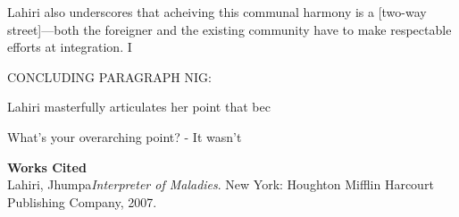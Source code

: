 \documentclass[12pt]{article}
\begin{document}
Lahiri also underscores that acheiving this communal harmony is a [two-way street]---both the foreigner
and the existing community have to make respectable efforts at integration. I

CONCLUDING PARAGRAPH NIG:

Lahiri masterfully articulates her point that bec




What's your overarching point? 
	- It wasn't
\begin{center}
  \textbf{Works Cited} \\
Lahiri, Jhumpa\textit{Interpreter of Maladies}. New York: Houghton Mifflin Harcourt Publishing Company, 2007.
\end{center}
\end{document}
